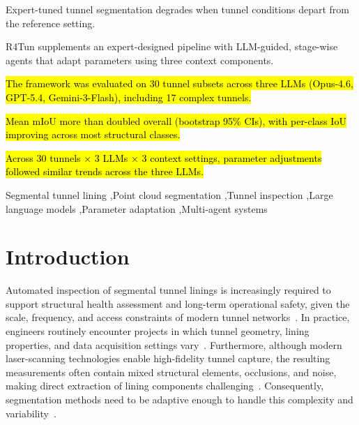 \documentclass[a4paper,fleqn]{cas-dc}
\begin{document}

\begin{highlights}

\item Expert-tuned tunnel segmentation degrades when tunnel conditions depart from the reference setting.
\item R4Tun supplements an expert-designed pipeline with LLM-guided, stage-wise agents that adapt parameters using three context components.
\item \hl{The framework was evaluated on 30 tunnel subsets across three LLMs (Opus-4.6, GPT-5.4, Gemini-3-Flash), including 17 complex tunnels.}
\item \hl{Mean mIoU more than doubled overall (bootstrap 95\% CIs), with per-class IoU improving across most structural classes.}
\item \hl{Across 30 tunnels $\times$ 3 LLMs $\times$ 3 context settings, parameter adjustments followed similar trends across the three LLMs.}

\end{highlights}


\begin{keywords}
Segmental tunnel lining \sep Point cloud segmentation \sep Tunnel inspection \sep Large language models \sep Parameter adaptation \sep Multi-agent systems
\end{keywords}

\maketitle

\smallskip

\section{Introduction}\label{sec:intro}


Automated inspection of segmental tunnel linings is increasingly required to support structural health assessment and long-term operational safety, given the scale, frequency, and access constraints of modern tunnel networks~\cite{attard2018}. In practice, engineers routinely encounter projects in which tunnel geometry, lining properties, and data acquisition settings vary~\cite{weidner2024generalized}. Furthermore, although modern laser-scanning technologies enable high-fidelity tunnel capture, the resulting measurements often contain mixed structural elements, occlusions, and noise, making direct extraction of lining components challenging~\cite{huang2021bim,sjolander2023towards}. Consequently, segmentation methods need to be adaptive enough to handle this complexity and variability~\cite{montero2015, strauss2020sensing, camuffo2022recent}. 
\end{document}
